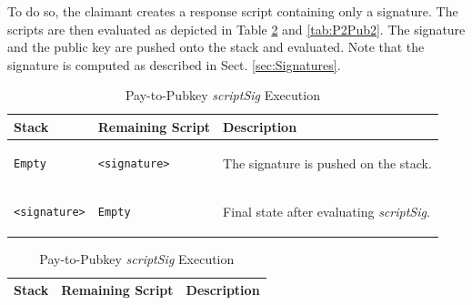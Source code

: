 \noindent
To do so, the claimant creates a response script containing only a signature. The scripts are then evaluated as depicted in Table \ref{tab:P2Pub1} and \ref{tab:P2Pub2}. The signature and the public key are pushed onto the stack and evaluated. Note that the signature is computed as described in Sect. \ref{sec:Signatures}.


\begin{table}
\begin{minipage}{\textwidth}

\centering
\begin{tabular}{| m{95pt} | m{145pt} | m{100pt} |} \hline
\textbf{Stack} & \textbf{Remaining Script} & \textbf{Description} \\ \hline \hline

\vspace{8pt}
\begin{BVerbatim}[fontsize==\relsize{-4}]
Empty
\end{BVerbatim} 
\vspace{4pt}
&
\vspace{8pt}
\begin{BVerbatim}[fontsize==\relsize{-4}]
<signature>
\end{BVerbatim} 
\vspace{4pt}
&
The signature is pushed on the stack.\\ \hline

\vspace{8pt}
\begin{BVerbatim}[fontsize==\relsize{-4}]
<signature>
\end{BVerbatim} 
\vspace{4pt}
&
\vspace{8pt}
\begin{BVerbatim}[fontsize==\relsize{-4}]
Empty
\end{BVerbatim} 
\vspace{4pt}
&
Final state after evaluating \textit{scriptSig}. \\ \hline

\end{tabular}
\vspace{5pt}
\caption{Pay-to-Pubkey \textit{scriptSig} Execution}
\label{tab:P2Pub1}

\vspace{15pt}

\begin{tabular}{| m{95pt} | m{145pt} | m{100pt} |}
\hline
\textbf{Stack} & \textbf{Remaining Script} & \textbf{Description} \\ \hline \hline


\end{tabular}
\end{minipage}
\end{table}

